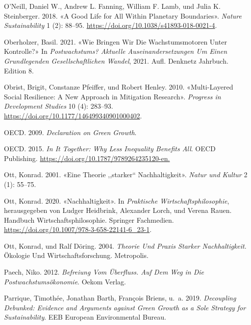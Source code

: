 \documentclass[
  nswissgerman,
  a4paper,
  openany]{book}
\newlength{\cslhangindent}
\newenvironment{CSLReferences}[2] %
 {\begin{list}{}{%
  \setlength{\itemindent}{0pt}
  \setlength{\leftmargin}{0pt}
  \setlength{\parsep}{0pt}
  \ifodd #1
   \setlength{\leftmargin}{\cslhangindent}
   \setlength{\itemindent}{-1\cslhangindent}
  \fi
  \setlength{\itemsep}{#2\baselineskip}}}
 {\end{list}}
\begin{document}
\begin{CSLReferences}{1}{1}
O'Neill, Daniel W., Andrew L. Fanning, William F. Lamb, und Julia K.
Steinberger. 2018. {«A Good Life for All Within Planetary Boundaries»}.
\emph{Nature Sustainability} 1 (2): 88--95.
\url{https://doi.org/10.1038/s41893-018-0021-4}.

Oberholzer, Basil. 2021. {«Wie Bringen Wir Die {Wachstumsmotoren} Unter
{Kontrolle}?»} In \emph{Postwachstums? {Aktuelle Auseinandersetzungen}
Um Einen Grundlegenden Gesellschaftlichen {Wandel}}, 2021. Aufl.
Denknetz {Jahrbuch}. Edition 8.

Obrist, Brigit, Constanze Pfeiffer, und Robert Henley. 2010.
{«Multi-Layered Social Resilience: A New Approach in Mitigation
Research»}. \emph{Progress in Development Studies} 10 (4): 283--93.
\url{https://doi.org/10.1177/146499340901000402}.

OECD. 2009. \emph{Declaration on {Green Growth}}.

OECD. 2015. \emph{In {It Together}: {Why Less Inequality Benefits All}}.
OECD Publishing. \url{https://doi.org/10.1787/9789264235120-en.}

Ott, Konrad. 2001. {«Eine {Theorie} ,,starker`` {Nachhaltigkeit}»}.
\emph{Natur und Kultur} 2 (1): 55--75.

Ott, Konrad. 2020. {«{Nachhaltigkeit}»}. In \emph{{Praktische
Wirtschaftsphilosophie}}, herausgegeben von Ludger Heidbrink, Alexander
Lorch, und Verena Rauen. {Handbuch Wirtschaftsphilosophie}. Springer
Fachmedien. \url{https://doi.org/10.1007/978-3-658-22141-6_23-1}.

Ott, Konrad, und Ralf Döring. 2004. \emph{Theorie Und {Praxis} Starker
{Nachhaltigkeit}}. {Ö}kologie Und {Wirtschaftsforschung}. Metropolis.

Paech, Niko. 2012. \emph{Befreiung Vom {{Ü}berfluss}. {Auf} Dem {Weg} in
Die {Postwachstums{ö}konomie}}. Oekom Verlag.

Parrique, Timothée, Jonathan Barth, François Briens, u.~a. 2019.
\emph{Decoupling Debunked: {Evidence} and Arguments against Green Growth
as a Sole Strategy for Sustainability}. EEB European Environmental
Bureau.


\end{CSLReferences}
\end{document}

